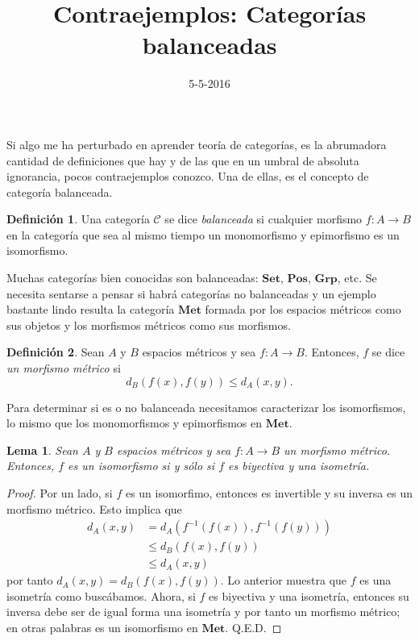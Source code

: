 \documentclass[letter,10pt,notitlepage]{amsart}
\title{Contraejemplos: Categorías balanceadas}
\date{5-5-2016}
\newtheorem{lemma}{Lema}
\theoremstyle{definition}
\newtheorem*{definition}{Definición}
\theoremstyle{remark}
\begin{document}
\maketitle

Si algo me ha perturbado en aprender teoría de categorías, es 
la abrumadora cantidad de definiciones que hay y de las que
en un umbral de absoluta ignorancia, pocos contraejemplos
conozco. Una de ellas, es el concepto de categoría balanceada.

\begin{definition}
  Una categoría \( \mathcal{C}\) se dice \emph{balanceada}
  si cualquier morfismo \( f \colon A \to B\) en la categoría
  que sea al mismo tiempo un monomorfismo y epimorfismo
  es un isomorfismo.
\end{definition}

Muchas categorías bien conocidas son balanceadas: \( \mathbf{Set}\),
\( \mathbf{Pos}\), \( \mathbf{Grp}\), etc. Se necesita sentarse
a pensar si habrá categorías no balanceadas y un ejemplo bastante
lindo resulta la categoría \( \mathbf{Met}\) formada por
los espacios métricos como sus objetos y los morfismos métricos
como sus morfismos.

\begin{definition}
  Sean \( A\) y \( B\) espacios métricos y sea
  \( f \colon A \to B\). Entonces, \( f\) se dice \emph{un
  morfismo métrico} si 
  \[ d_B(f(x),f(y)) \leq d_A(x,y).\]
\end{definition}

Para determinar si es o no balanceada necesitamos caracterizar
los isomorfismos, lo mismo que los monomorfismos y epimorfismos en 
\( \mathbf{Met}\). 

\begin{lemma}
  Sean \( A\) y \( B\) espacios métricos y sea \( f \colon A \to B\)
  un morfismo métrico. Entonces, \( f\) es un isomorfismo
  si y sólo si  \( f\) es biyectiva y una isometría.
\end{lemma}
\begin{proof}
  Por un lado, si \( f\) es un isomorfimo, entonces es invertible y 
  su inversa es un morfismo métrico. Esto implica que
  \begin{align*}
    d_A(x,y) &= d_A\left( f^{-1}(f(x)), f^{-1}(f(y)) \right) \\
    	&\leq d_B(f(x),f(y)) \\
	& \leq d_A(x,y)
  \end{align*}
  por tanto \( d_A(x,y) = d_B(f(x),f(y))\). Lo anterior muestra que \( f\)
  es una isometría como buscábamos. Ahora, si \( f\) es biyectiva y 
  una isometría, entonces su inversa debe ser de igual forma una
  isometría y por tanto un morfismo métrico; en otras palabras
  es un isomorfismo en \( \mathbf{Met}\). Q.E.D.
\end{proof}
\end{document}
